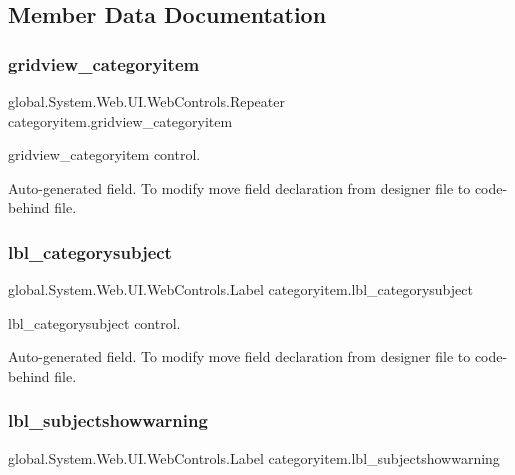 \subsection{Member Data Documentation}
\mbox{\label{classcategoryitem_aaf845f0bee4a6951cfd3fd3c29bdc12b}} 
\subsubsection{\texorpdfstring{gridview\_categoryitem}{gridview\_categoryitem}}
{\footnotesize\ttfamily global.\+System.\+Web.\+U\+I.\+Web\+Controls.\+Repeater categoryitem.\+gridview\+\_\+categoryitem\hspace{0.3cm}{\ttfamily [protected]}}



gridview\+\_\+categoryitem control. 

Auto-\/generated field. To modify move field declaration from designer file to code-\/behind file. \mbox{\label{classcategoryitem_ab8f9bf9ea5c9fd96945dfc0e54f4ccfd}} 
\subsubsection{\texorpdfstring{lbl\_categorysubject}{lbl\_categorysubject}}
{\footnotesize\ttfamily global.\+System.\+Web.\+U\+I.\+Web\+Controls.\+Label categoryitem.\+lbl\+\_\+categorysubject\hspace{0.3cm}{\ttfamily [protected]}}



lbl\+\_\+categorysubject control. 

Auto-\/generated field. To modify move field declaration from designer file to code-\/behind file. \mbox{\label{classcategoryitem_a878b0b43778ad25d87c040e19bd47f73}} 
\subsubsection{\texorpdfstring{lbl\_subjectshowwarning}{lbl\_subjectshowwarning}}
{\footnotesize\ttfamily global.\+System.\+Web.\+U\+I.\+Web\+Controls.\+Label categoryitem.\+lbl\+\_\+subjectshowwarning\hspace{0.3cm}{\ttfamily [protected]}}



